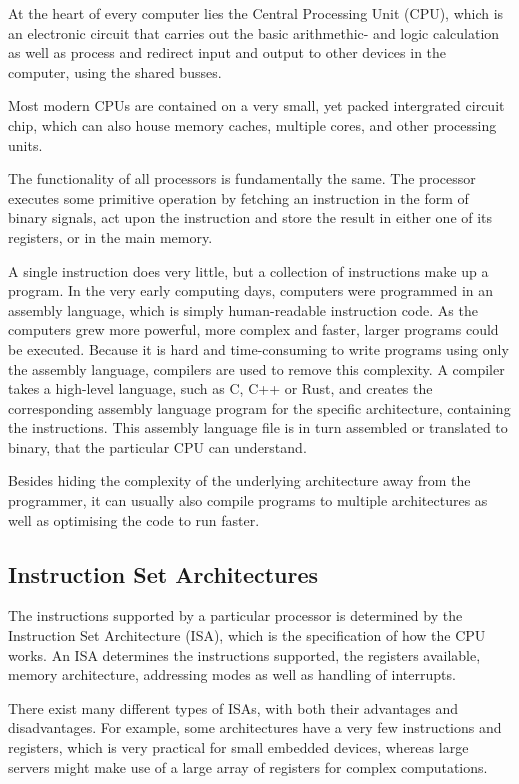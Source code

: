 At the heart of every computer lies the Central Processing Unit (CPU),
which is
an electronic circuit that carries out the basic arithmethic- and logic
calculation as well as process and redirect input and output to other devices
in the computer, using the shared busses.

Most modern CPUs are contained on a very small, yet packed intergrated circuit
chip, which can also house memory caches, multiple cores, and other processing
units.

The functionality of all processors is fundamentally the same. The processor
executes some primitive operation by fetching an instruction in the form of
binary signals, act upon the instruction and store the result in either
one of its registers, or in the main memory.

A single instruction does very little, but a collection of instructions
make up
a program. In the very early computing days, computers were programmed in an
assembly language, which is simply human-readable instruction code. As the
computers grew more powerful, more complex and faster, larger programs could be
executed. Because it is hard and time-consuming to write programs using
only the
assembly language, compilers are used to remove this complexity. A
compiler takes a high-level language, such as C, C++ or Rust, and creates the
corresponding assembly language program for the specific architecture,
containing the instructions. This assembly language file is in turn assembled
or translated to binary, that the particular CPU can understand.

Besides hiding the complexity of the underlying architecture away from the
programmer, it can usually also compile programs to multiple architectures as
well as optimising the code to run faster.

\subsection{Instruction Set Architectures}
The instructions supported by a particular processor is determined by the
Instruction Set Architecture (ISA), which is the specification of how the CPU
works. An ISA determines the instructions
supported, the registers available, memory architecture, addressing modes as
well as handling of interrupts.

There exist many different types of ISAs, with both their advantages and
disadvantages. For example, some architectures have a very few instructions
and registers, which is very practical for small embedded devices,
whereas large
servers might make use of a large array of registers for complex computations.

